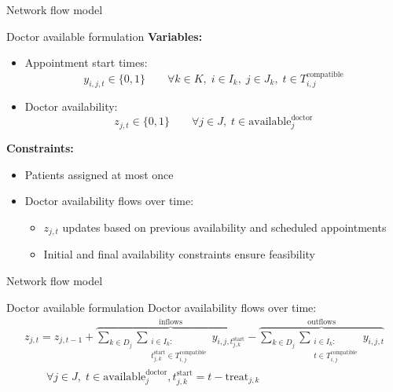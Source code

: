 \documentclass{beamer}
\begin{document}
\begin{frame}{Network flow model}
    \begin{block}{Doctor available formulation}
        \textbf{Variables:}
        \begin{itemize}
            \item Appointment start times: 
            \[
            y_{i,j,t} \in \{0,1\} \qquad \forall k \in K, \;i \in I_k, \;j \in J_k, \;t \in T^\mathrm{compatible}_{i,j}
            \]
            \item Doctor availability:
            \[
            z_{j,t} \in \{0,1\} \qquad \forall j \in J, \;t\in \mathrm{available}^\mathrm{doctor}_j
            \]
        \end{itemize}
        \textbf{Constraints:}
        \begin{itemize}
            \item Patients assigned at most once
            \item Doctor availability flows over time:
            \begin{itemize}
                \item $z_{j,t}$ updates based on previous availability and scheduled appointments
                \item Initial and final availability constraints ensure feasibility
            \end{itemize}
        \end{itemize}
    \end{block}
\end{frame}

\begin{frame}{Network flow model}
    \begin{block}{Doctor available formulation}
        Doctor availability flows over time:
        \begin{multline*}
            z_{j,t} = z_{j,t-1} 
            + \overbrace{\sum_{k \in D_j} \sum_{\substack{i \in I_k: \\ t^\mathrm{start}_{j,k} \in T^\mathrm{compatible}_{i,j}}} y_{i,j,t^\mathrm{start}_{j,k}}}^{\text{inflows}}
            - \overbrace{\sum_{k \in D_j} \sum_{\substack{i \in I_k: \\ t \in T^\mathrm{compatible}_{i,j}}} y_{i,j,t}}^{\text{outflows}} \\
            \qquad \forall j \in J,\; t \in \mathrm{available}^\mathrm{doctor}_j, t^\mathrm{start}_{j,k} = t - \mathrm{treat}_{j,k}
        \end{multline*}
    \end{block}
\end{frame}
\end{document}
